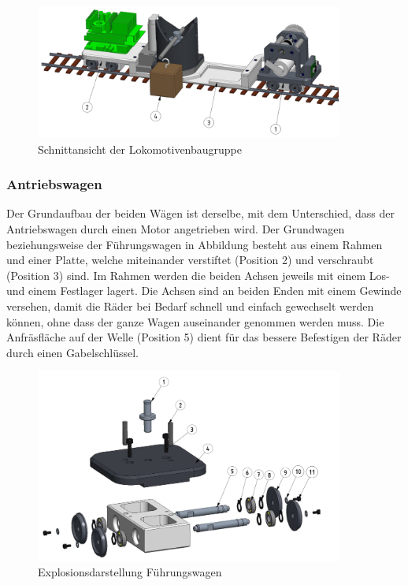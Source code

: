 \documentclass[../../main.tex]{subfiles}
\begin{document}
    \begin{figure}[H] %
        \centering
        \includegraphics[width=0.9\textwidth]{Lokomotive.png}
        \caption{Schnittansicht der Lokomotivenbaugruppe}
        \label{fig:schnitt_lokomotive}
    \end{figure}
    \newpage

    \subsubsection{Antriebswagen}
    Der Grundaufbau der beiden Wägen ist derselbe, mit dem Unterschied, dass der Antriebswagen durch einen Motor angetrieben wird. Der Grundwagen beziehungsweise der Führungswagen in Abbildung besteht aus einem Rahmen und einer Platte, welche miteinander verstiftet (Position 2) und verschraubt (Position 3) sind. Im Rahmen werden die beiden Achsen jeweils mit einem Los- und einem Festlager lagert. Die Achsen sind an beiden Enden mit einem Gewinde versehen, damit die Räder bei Bedarf schnell und einfach gewechselt werden können, ohne dass der ganze Wagen auseinander genommen werden muss. Die Anfräsfläche auf der Welle (Position 5) dient für das bessere Befestigen der Räder durch einen Gabelschlüssel.

     \begin{figure}[H] %
        \centering
        \includegraphics[width=0.9\textwidth]{Fuehrungswagen.png}
        \caption{Explosionsdarstellung Führungswagen}
        \label{fig:expl_fuehrungswagen}
    \end{figure}   
\end{document}
